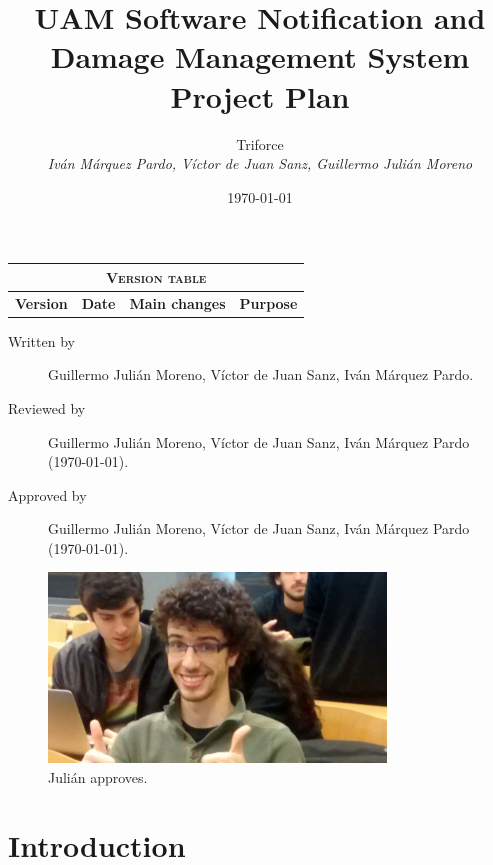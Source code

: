 \documentclass[11pt]{report}
\title{UAM Software Notification and Damage Management System \\ Project Plan}
\date{\today}
\author{{\Large Triforce} \\ \vspace{5pt} \textit{Iván Márquez Pardo, Víctor de Juan Sanz, Guillermo Julián Moreno}}
\begin{document}
\maketitle

\begin{table}[hbtp]
\centering
\begin{tabular}{|c|c|p{3cm}|p{3.5cm}|}
\hline \multicolumn{4}{|c|}{\textsc{Version table}} \\ \hline \hline
\textbf{Version} & \textbf{Date} & \textbf{Main changes} & \textbf{Purpose} \\ \hline
\end{tabular}
\end{table}

\begin{description}
\item[Written by] Guillermo Julián Moreno, Víctor de Juan Sanz, Iván Márquez Pardo.
\item[Reviewed by] Guillermo Julián Moreno, Víctor de Juan Sanz, Iván Márquez Pardo (\today).
\item[Approved by] Guillermo Julián Moreno, Víctor de Juan Sanz, Iván Márquez Pardo (\today).
\end{description}

\begin{figure}[hbtp]
\centering
\includegraphics[width=0.8\textwidth]{../Yo.jpg}
\caption{Julián approves.}
\end{figure}


\newpage

\begin{abstract}
\end{abstract}

\tableofcontents
\newpage
\pagestyle{plain}

\chapter{Introduction}
\end{document}
